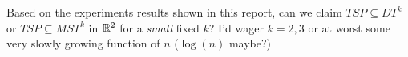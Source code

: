 \begin{appendices}
\begin{itemize}
      Based on the experiments results shown in this report, can we 
      claim  $TSP \subseteq DT^{k}$ 
      or $TSP \subseteq MST^{k}$ in $\mathbb{R}^2$ for a \textit{small} fixed $k$? I'd wager $k=2,3$ 
      or at worst some very slowly growing function of $n$ ($\log (n)$ maybe?) 


       

\end{itemize}

\end{appendices}
